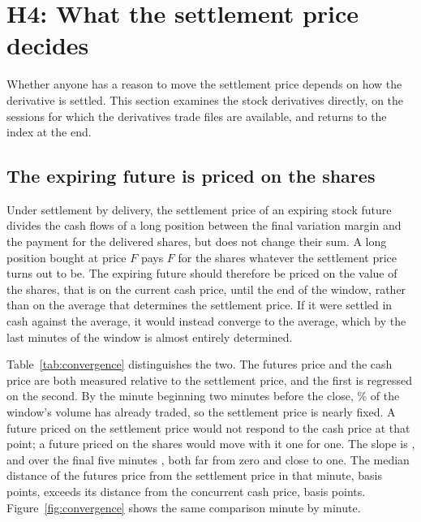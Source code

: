 \section{H4: What the settlement price decides}\label{sec:derivatives}

Whether anyone has a reason to move the settlement price depends on how the derivative is
settled. This section examines the stock derivatives directly, on the \ConvSessions{} sessions
for which the derivatives trade files are available, and returns to the index at the end.

\subsection{The expiring future is priced on the shares}

Under settlement by delivery, the settlement price of an expiring stock future divides the
cash flows of a long position between the final variation margin and the payment for the
delivered shares, but does not change their sum. A long position bought at price $F$ pays
$F$ for the shares whatever the settlement price turns out to be. The expiring future should
therefore be priced on the value of the shares, that is on the current cash price, until the
end of the window, rather than on the average that determines the settlement price. If it were
settled in cash against the average, it would instead converge to the average, which by the
last minutes of the window is almost entirely determined.

Table~\ref{tab:convergence} distinguishes the two. The futures price and the cash price are
both measured relative to the settlement price, and the first is regressed on the second. By
the minute beginning two minutes before the close, \ConvExpiryMTwoEightFixed{}\% of the window's volume has already
traded, so the settlement price is nearly fixed. A future priced on the settlement price would
not respond to the cash price at that point; a future priced on the shares would move with it
one for one. The slope is \ConvExpiryMTwoEight{}, and over the final five minutes
\ConvExpiryLastFive{}, both far from zero and close to one. The median distance of the futures
price from the settlement price in that minute, \ConvExpiryMTwoEightGapsettle{} basis points, exceeds
its distance from the concurrent cash price, \ConvExpiryMTwoEightGapcash{} basis points.
Figure~\ref{fig:convergence} shows the same comparison minute by minute.

\begin{table}[htbp]
\centering
\small
\caption{Pricing of the expiring stock future in the settlement window. Regression of the
futures price on the cash price, both in basis points relative to the settlement price, over
security-minutes of the window; a slope of one indicates that the future moves with the cash
price, a slope of zero that it is priced on the settlement price. Standard errors clustered by
security in parentheses. Control sessions are the trading day before each expiry, on which the
same future has one day to run.}
\label{tab:convergence}

\end{table}

